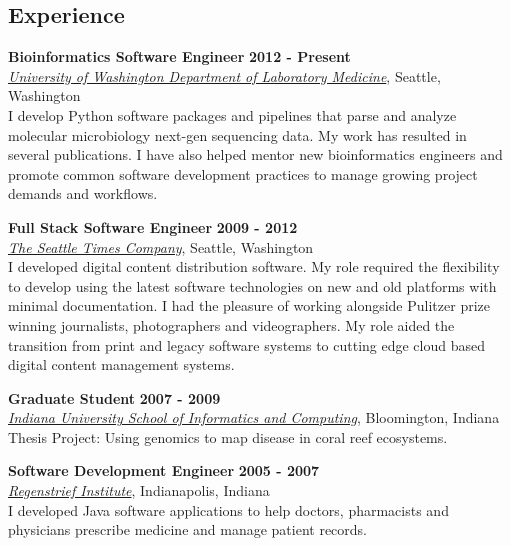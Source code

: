 \documentclass{res}
\begin{document}

\address{Seattle, Washington}
\address{crosenth@gmail.com}

\begin{resume}

\section{Experience}

\textbf{Bioinformatics Software Engineer} \hfill \textbf{2012 - Present}\\
\href{http://depts.washington.edu/labweb/}{\textit{University of Washington Department of Laboratory Medicine}},
Seattle, Washington\\
 I develop Python software packages and pipelines that parse and analyze molecular microbiology next-gen sequencing data. 
 My work has resulted in several publications. I have also helped mentor new bioinformatics engineers and promote 
 common software development practices to manage growing project demands and workflows.

\textbf{Full Stack Software Engineer} \hfill \textbf{2009 - 2012}\\
\href{http://www.seattletimes.com/}{\textit{The Seattle Times Company}}, Seattle, Washington\\
 I developed digital content distribution software. My role required the flexibility to develop using the latest software 
 technologies on new and old platforms with minimal documentation. I had the pleasure of working alongside Pulitzer prize 
 winning journalists, photographers and videographers. My role aided the transition from print and legacy software 
 systems to cutting edge cloud based digital content management systems.

\textbf{Graduate Student} \hfill \textbf{2007 - 2009}\\
\href{https://www.soic.indiana.edu/}{\textit{Indiana University School of Informatics and Computing}}, Bloomington, Indiana\\
 Thesis Project: Using genomics to map disease in coral reef ecosystems.

\textbf{Software Development Engineer} \hfill \textbf{2005 - 2007}\\
\href{http://www.regenstrief.org/}{\textit{Regenstrief Institute}}, Indianapolis, Indiana\\
 I developed Java software applications to help doctors, pharmacists and physicians 
 prescribe medicine and manage patient records.


\end{resume}
\end{document}
